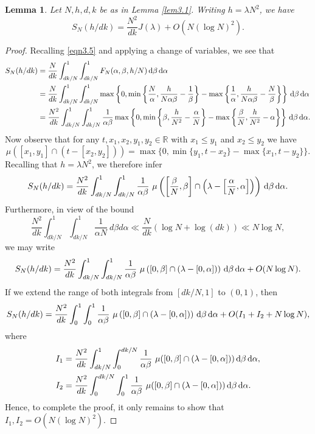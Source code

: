 \documentclass[12pt,reqno]{amsart}
\newtheorem{lemma}[theorem]{Lemma}
\theoremstyle{definition}
\theoremstyle{remark}
\numberwithin{equation}{section}
\def \R {\mathbb{R}}
\def\d{{\,{\rm d}}}
\newcommand\1{\mathds{1}}
\begin{document}
\begin{lemma} \label{lem3.2}
    Let $N,h,d,k$ be as in Lemma \ref{lem3.1}. Writing $h = \lambda N^2$, we have
    \[ S_N(h/dk) = \frac{N^2}{dk} J(\lambda)  + O(N(\log N)^2 ). \]
\end{lemma}
\begin{proof}
Recalling \eqref{eqn3.5} and applying a change of variables, we see that
\begin{align*}
S_N(h/dk) & = \frac{N}{dk} \int_{dk/N}^1 \int_{dk/N}^1 F_N( \alpha, \beta , h/N)  \d \beta \d \alpha \\
& = \frac{N}{dk} \int_{dk/N}^1 \int_{dk/N}^1 \max\left\lbrace 0,\min\left\{\frac{N}{\alpha} ,  \frac{h}{N\alpha\beta} - \frac{1}{\beta} \right\}-\max\left\{ \frac{1}{\alpha}, \frac{h}{N\alpha\beta}-\frac{N}{\beta} \right\}\right\rbrace  \d \beta \d \alpha \\
& = \frac{N^2}{dk} \int_{dk/N}^1 \int_{dk/N}^1 \frac{1}{\alpha \beta} \max \left\{  0, \min\left\{ \beta, \frac{h}{N^2}-\frac{\alpha}{N} \right\} - \max \left\{ \frac{\beta}{N} , \frac{h}{N^2}-\alpha\right\} \right\}  \d \beta \d \alpha.
\end{align*}
Now observe that for any $t,x_1,x_2,y_1,y_2\in\R$ with $x_1 \leqslant y_1$ and $x_2 \leqslant y_2$ we have
\[ \mu([x_1, y_1] \cap (t - [x_2, y_2]) ) = \max \{ 0, \min\{ y_1, t - x_2\} - \max\{ x_1, t - y_2 \} \} .\]
Recalling that $h=\lambda N^2$, we therefore infer
\[ S_N(h/dk) = \frac{N^2}{dk} \int_{dk/N}^1 \int_{dk/N}^1 \frac{1}{\alpha \beta} \ \mu \left( \left[ \frac{\beta}{N}, \beta \right] \cap \left(\lambda - \left[ \frac{\alpha}{N}, \alpha \right] \right) \right)  \d \beta \d \alpha.  \]
Furthermore, in view of the bound
\[ \frac{N^2}{dk} \int_{dk/N}^1 \int_{dk/N}^1  \frac{1}{\alpha N} \ d \beta d \alpha \ll \frac{N}{dk} ( \log N + \log (dk) ) \ll N \log N, \]
we may write
\begin{equation*}
    S_N(h/dk) = \frac{N^2}{dk} \int_{dk/N}^1 \int_{dk/N}^1 \frac{1}{\alpha \beta} \ \mu \left( \left[ 0, \beta \right] \cap \left(\lambda - \left[ 0, \alpha \right] \right) \right)  \d \beta \d \alpha +O(N\log N).
\end{equation*}
If we extend the range of both integrals from $[dk/N,1]$ to $(0,1)$, then
\begin{equation*}
    S_N(h/dk) = \frac{N^2}{dk} \int_{0}^1 \int_{0}^1 \frac{1}{\alpha \beta} \ \mu \left( \left[ 0, \beta \right] \cap \left(\lambda - \left[ 0, \alpha \right] \right) \right)  \d \beta \d \alpha +O(I_1+I_2+N\log N),
\end{equation*}
where
\begin{align*}
   I_1 &= \frac{N^2}{dk}\int_{dk/N}^1\int_0^{dk/N} \frac{1}{\alpha \beta} \ \mu( [0, \beta] \cap (\lambda - [0, \alpha] ) )\d \beta \d\alpha,\\
   I_2 &= \frac{N^2}{dk} \int_0^{dk/N} \int_{0}^1 \frac{1}{\alpha \beta} \ \mu( [0, \beta] \cap (\lambda - [0, \alpha] ) )\d \beta \d\alpha.
\end{align*}
Hence, to complete the proof, it only remains to show that $I_1, I_2=O(N(\log N)^2)$.


\end{proof}
\end{document}
